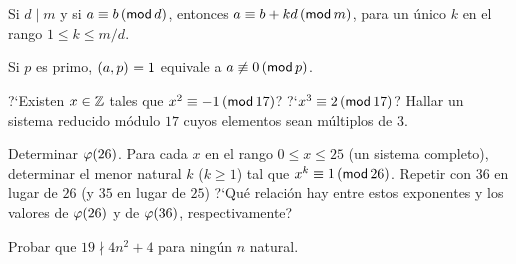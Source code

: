 \begin{ejerCongruencias}
	Si $d\mid m$ y si $a\equiv b\tmodulo[d]$, entonces
	$a\equiv b+kd\tmodulo[m]$, para un \'unico $k$ en el rango
	$1\leq k\leq m/d$.
\end{ejerCongruencias}

\begin{ejerCongruencias}
	Si $p$ es primo, $\mcd{a,p}=1$ equivale a $a\not\equiv 0\tmodulo[p]$.
\end{ejerCongruencias}

\begin{ejerCongruencias}
	?`Existen $x\in\Enteros$ tales que $x^2\equiv -1\tmodulo[17]$?
	?`$x^3\equiv 2\tmodulo[17]$? Hallar un sistema reducido m\'odulo $17$
	cuyos elementos sean m\'ultiplos de $3$.
\end{ejerCongruencias}

\begin{ejerCongruencias}
	Determinar $\eulerphi(26)$. Para cada $x$ en el rango
	$0\leq x\leq 25$ (un sistema completo), determinar el menor
	natural $k$ ($k\geq 1$) tal que $x^k\equiv 1\tmodulo[26]$.
	Repetir con $36$ en lugar de $26$ (y $35$ en lugar de $25$)
	?`Qu\'e relaci\'on hay entre estos exponentes y los valores de
	$\eulerphi(26)$ y de $\eulerphi(36)$, respectivamente?
\end{ejerCongruencias}

\begin{ejerCongruencias}
	Probar que $19\nmid 4n^2+4$ para ning\'un $n$ natural.
\end{ejerCongruencias}


